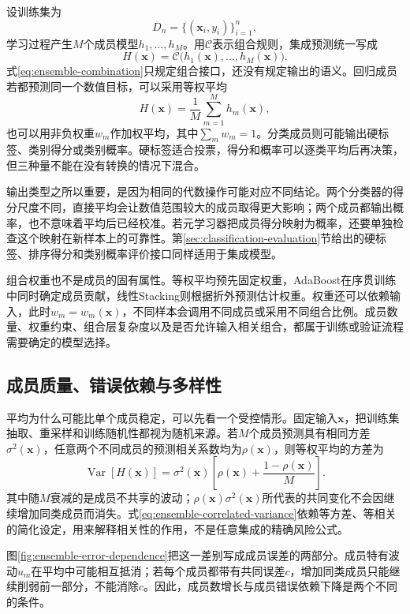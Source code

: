 设训练集为
\[
  D_n=\{(\bm{x}_i,y_i)\}_{i=1}^{n},
\]
学习过程产生$M$个成员模型$h_1,\ldots,h_M$。用$\mathcal{C}$表示组合规则，集成预测统一写成
\begin{equation}
  H(\bm{x})
  =\mathcal{C}\bigl(h_1(\bm{x}),\ldots,h_M(\bm{x})\bigr).
  \label{eq:ensemble-combination}
\end{equation}
式\eqref{eq:ensemble-combination}只规定组合接口，还没有规定输出的语义。回归成员若都预测同一个数值目标，可以采用等权平均
\[
  H(\bm{x})=\frac{1}{M}\sum_{m=1}^{M}h_m(\bm{x}),
\]
也可以用非负权重$w_m$作加权平均，其中$\sum_m w_m=1$。分类成员则可能输出硬标签、类别得分或类别概率。硬标签适合投票，得分和概率可以逐类平均后再决策，但三种量不能在没有转换的情况下混合。

输出类型之所以重要，是因为相同的代数操作可能对应不同结论。两个分类器的得分尺度不同，直接平均会让数值范围较大的成员取得更大影响；两个成员都输出概率，也不意味着平均后已经校准。若元学习器把成员得分映射为概率，还要单独检查这个映射在新样本上的可靠性。第\ref{sec:classification-evaluation}节给出的硬标签、排序得分和类别概率评价接口同样适用于集成模型。

组合权重也不是成员的固有属性。等权平均预先固定权重，AdaBoost在序贯训练中同时确定成员贡献，线性Stacking则根据折外预测估计权重。权重还可以依赖输入，此时$w_m=w_m(\bm{x})$，不同样本会调用不同成员或采用不同组合比例。成员数量、权重约束、组合层复杂度以及是否允许输入相关组合，都属于训练或验证流程需要确定的模型选择。

\subsection{成员质量、错误依赖与多样性}
\label{sec:ensemble-quality-dependence-diversity}

平均为什么可能比单个成员稳定，可以先看一个受控情形。固定输入$\bm{x}$，把训练集抽取、重采样和训练随机性都视为随机来源。若$M$个成员预测具有相同方差$\sigma^2(\bm{x})$，任意两个不同成员的预测相关系数均为$\rho(\bm{x})$，则等权平均的方差为
\begin{equation}
  \operatorname{Var}\!\left[H(\bm{x})\right]
  =
  \sigma^2(\bm{x})
  \left[
    \rho(\bm{x})
    +
    \frac{1-\rho(\bm{x})}{M}
  \right].
  \label{eq:ensemble-correlated-variance}
\end{equation}
其中随$M$衰减的是成员不共享的波动；$\rho(\bm{x})\sigma^2(\bm{x})$所代表的共同变化不会因继续增加同类成员而消失。式\eqref{eq:ensemble-correlated-variance}依赖等方差、等相关的简化设定，用来解释相关性的作用，不是任意集成的精确风险公式。

图\ref{fig:ensemble-error-dependence}把这一差别写成成员误差的两部分。成员特有波动$u_m$在平均中可能相互抵消；若每个成员都带有共同误差$c$，增加同类成员只能继续削弱前一部分，不能消除$c$。因此，成员数增长与成员错误依赖下降是两个不同的条件。

